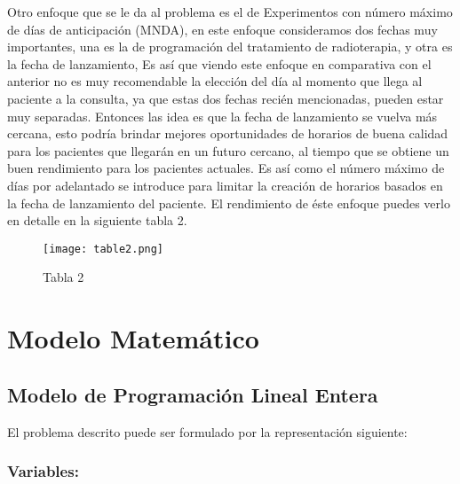 \documentclass[letter, 10pt]{article}
\begin{document}
Otro enfoque que se le da al problema es el de Experimentos con número máximo de días de anticipación (MNDA), en este enfoque consideramos dos fechas muy importantes, una es la de programación del tratamiento de radioterapia, y otra es la fecha de lanzamiento, Es así que viendo este enfoque en comparativa con el anterior no es muy recomendable la elección del día al momento que llega al paciente a la consulta, ya que estas dos fechas recién mencionadas, pueden estar muy separadas. Entonces las idea es que la fecha de lanzamiento se vuelva más cercana, esto podría brindar mejores oportunidades de horarios de buena calidad para los pacientes que llegarán en un futuro cercano, al tiempo que se obtiene un buen rendimiento para los pacientes actuales. Es así como el número máximo de días por adelantado se introduce para limitar la creación de horarios basados en la fecha de lanzamiento del paciente. El rendimiento de éste enfoque puedes verlo en detalle en la siguiente tabla 2.

\begin{figure}[h]
    \begin{center}
         \texttt{[image: table2.png]}\\
    \end{center}
    \caption{Tabla 2}
\end{figure}

\newpage

\section{Modelo Matem\'atico}

\subsection{Modelo de Programación Lineal Entera}

El problema descrito puede ser formulado por la representación siguiente:

\subsubsection{Variables:}
\end{document}
